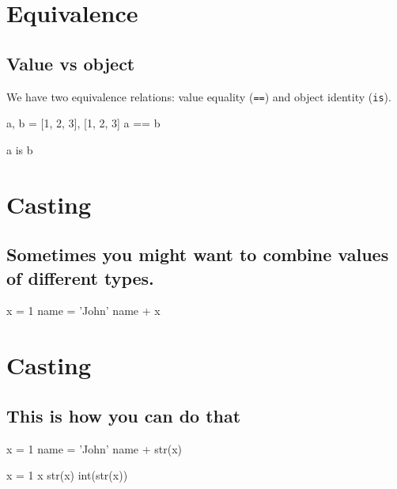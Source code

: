 \documentclass[aspectratio=1610,slidestop]{beamer}
\begin{document}
\section{Equivalence}
\subsection{Value vs object}
\begin{pframe}
 We have two equivalence relations: value equality (\texttt{==}) and
 object identity (\texttt{is}).
\begin{pyconsole}
a, b = [1, 2, 3], [1, 2, 3]
a == b

a is b
\end{pyconsole}
\end{pframe}


\section{Casting}
\subsection{Sometimes you might want to combine values of different types.}
\begin{pframe}
\begin{pyconsole}
x = 1
name = 'John'
name + x
\end{pyconsole}
\end{pframe}


\section{Casting}
\subsection{This is how you can do that}
\begin{pframe}
\begin{pyconsole}
x = 1
name = 'John'
name + str(x)
\end{pyconsole}
\begin{pyconsole}
x = 1
x
str(x)
int(str(x))
\end{pyconsole}
\end{pframe}
\end{document}
